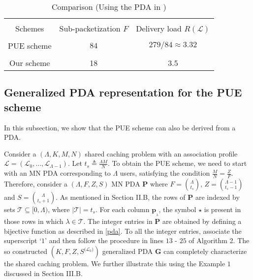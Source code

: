 \documentclass[conference,a4paper,10pt]{IEEEtran}
\begin{document}
\begin{table}[ht]
\centering
\caption{Comparison (Using the PDA in \cite{PDA2})}
\begin{tabular}{ c c c }
\hline
\\
Schemes & \makecell{Sub-packetization\\ $F$} & \makecell{Delivery load\\ $R(\mathcal{L})$} \\
\hline
\\

PUE scheme \cite{PUE}	& $84$  & $279/84 \approx 3.32$ \\
\\
Our scheme  & 18 & 3.5 \\
\hline
\end{tabular}
\label{tab:multicol}
\end{table}



\subsection{Generalized PDA representation for the PUE scheme}
In this subsection, we show that the PUE scheme can also be derived from a PDA.  

Consider a $(\Lambda,K,M,N)$ shared caching problem with an association profile $\mathcal{L}=(\mathcal{L}_0,\ldots,\mathcal{L}_{\Lambda-1})$. Let $t_s \triangleq\frac{\Lambda M}{N}$. To obtain the PUE scheme, we need to start with an MN PDA corresponding to $\Lambda$ users, satisfying the condition $\frac{M}{N}=\frac{Z}{F}$. Therefore, consider a $(\Lambda,F,Z,S)$ MN PDA $\mathbf{P}$ where $F = \binom{\Lambda}{t_s}$, $Z=\binom{\Lambda-1}{t_s-1}$ and $S=\binom{\Lambda}{t_s+1}$.
As mentioned in Section II.B, the rows of $\mathbf{P}$ are indexed by sets $\mathcal{T}\subseteq [0,\Lambda)$, where $|\mathcal{T}|=t_s$. For each column $\mathbf{p}_{_\lambda}$, the symbol $\star$ is present in those rows in which $\lambda \in \mathcal{T}$. The integer entries in $\mathbf{P}$ are obtained by defining a bijective function as described in \eqref{pda}. To all the integer entries, associate the superscript `$1$' and then follow the procedure in lines $13$ - $25$ of Algorithm 2. The so constructed $(K,F,Z,S^{{(\mathcal{L}_0})})$ generalized PDA $\mathbf{G}$ can completely characterize the shared caching problem. We further illustrate this using the Example $1$ discussed in Section III.B.
\end{document}

